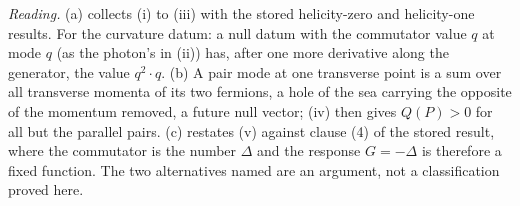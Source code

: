 \emph{Reading.} (a) collects (i) to (iii) with the stored helicity-zero and helicity-one results. For the curvature datum: a null datum with the commutator value $q$ at mode $q$ (as the photon's in (ii)) has, after one more derivative along the generator, the value $q^{2}\cdot q$. (b) A pair mode at one transverse point is a sum over all transverse momenta of its two fermions, a hole of the sea carrying the opposite of the momentum removed, a future null vector; (iv) then gives $Q(P) > 0$ for all but the parallel pairs. (c) restates (v) against clause (4) of the stored result, where the commutator is the number $\Delta$ and the response $G = -\Delta$ is therefore a fixed function. The two alternatives named are an argument, not a classification proved here.
